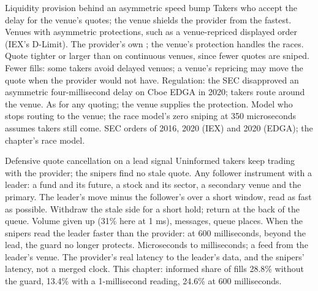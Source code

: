 \begin{strategyfile}{Liquidity provision behind an asymmetric speed bump}\label{strat:hf:latency-arbitrage-and-its-defence:bump}
 Takers who accept the delay for the venue's quotes; the venue shields the provider from the fastest.
 Venues with asymmetric protections, such as a venue-repriced displayed order (IEX's D-Limit).
 The provider's own ; the venue's protection handles the races.
 Quote tighter or larger than on continuous venues, since fewer quotes are sniped.
 Fewer fills: some takers avoid delayed venues; a venue's repricing may move the quote when the provider would not have.
 Regulation: the SEC disapproved an asymmetric four-millisecond delay on Cboe EDGA in 2020; takers route around the venue.
 As for any quoting; the venue supplies the protection.
 Model who stops routing to the venue; the race model's zero sniping at 350 microseconds assumes takers still come.
 SEC orders of 2016, 2020 (IEX) and 2020 (EDGA); the chapter's race model.
\end{strategyfile}

\begin{strategyfile}{Defensive quote cancellation on a lead signal}\label{strat:hf:latency-arbitrage-and-its-defence:guard}
 Uninformed takers keep trading with the provider; the snipers find no stale quote.
 Any follower instrument with a leader: a fund and its future, a stock and its sector, a secondary venue and the
primary.
 The leader's move minus the follower's over a short window, read as fast as possible.
 Withdraw the stale side for a short hold; return at the back of the queue.
 Volume given up (31\% here at 1 ms), messages, queue places.
 When the snipers read the leader faster than the provider: at 600 milliseconds, beyond the lead, the guard no longer protects.
 Microseconds to milliseconds; a feed from the leader's venue.
 The provider's real latency to the leader's data, and the snipers' latency, not a merged clock.
 This chapter: informed share of fills 28.8\% without the guard, 13.4\% with a 1-millisecond reading, 24.6\% at 600 milliseconds.
\end{strategyfile}

